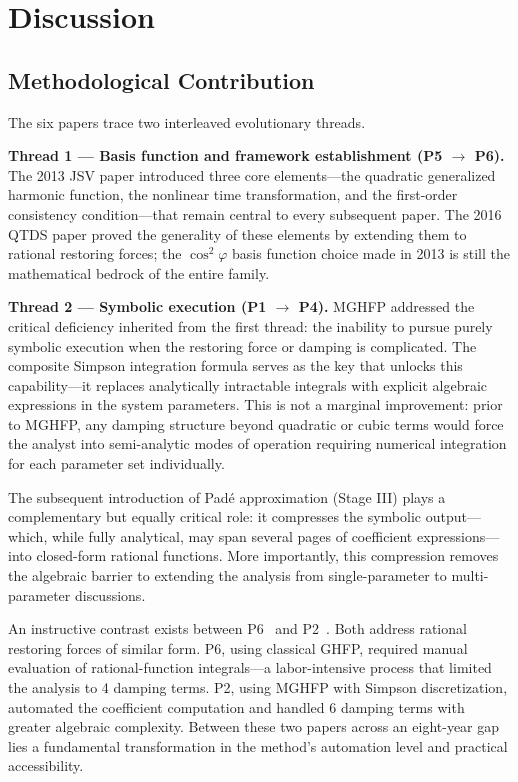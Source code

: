 \documentclass[11pt,a4paper]{article}
\begin{document}
\section{Discussion}

\subsection{Methodological Contribution}

The six papers trace two interleaved evolutionary threads.

\textbf{Thread 1 --- Basis function and framework establishment (P5 $\to$ P6).} The 2013 JSV paper introduced three core elements---the quadratic generalized harmonic function, the nonlinear time transformation, and the first-order consistency condition---that remain central to every subsequent paper. The 2016 QTDS paper proved the generality of these elements by extending them to rational restoring forces; the $\cos^2\varphi$ basis function choice made in 2013 is still the mathematical bedrock of the entire family.

\textbf{Thread 2 --- Symbolic execution (P1 $\to$ P4).} MGHFP addressed the critical deficiency inherited from the first thread: the inability to pursue purely symbolic execution when the restoring force or damping is complicated. The composite Simpson integration formula serves as the key that unlocks this capability---it replaces analytically intractable integrals with explicit algebraic expressions in the system parameters. This is not a marginal improvement: prior to MGHFP, any damping structure beyond quadratic or cubic terms would force the analyst into semi-analytic modes of operation requiring numerical integration for each parameter set individually.

The subsequent introduction of Pad\'e approximation (Stage III) plays a complementary but equally critical role: it compresses the symbolic output---which, while fully analytical, may span several pages of coefficient expressions---into closed-form rational functions. More importantly, this compression removes the algebraic barrier to extending the analysis from single-parameter to multi-parameter discussions.

An instructive contrast exists between P6~\cite{P6} and P2~\cite{P2}. Both address rational restoring forces of similar form. P6, using classical GHFP, required manual evaluation of rational-function integrals---a labor-intensive process that limited the analysis to 4 damping terms. P2, using MGHFP with Simpson discretization, automated the coefficient computation and handled 6 damping terms with greater algebraic complexity. Between these two papers across an eight-year gap lies a fundamental transformation in the method's automation level and practical accessibility.
\end{document}
